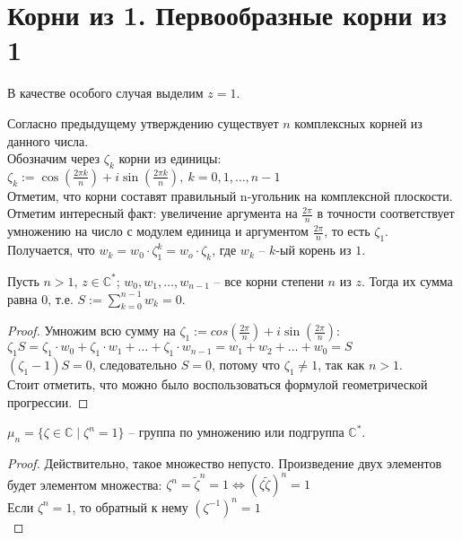 
\section{Корни из 1. Первообразные корни из 1}
\begin{normalsize}
  \begin{theorem-non}
    В качестве особого случая выделим $z=1$.
  \end{theorem-non}
  Согласно предыдущему утверждению существует $n$ комплексных корней из данного числа. \\

  Обозначим через $\zeta_k$ корни из единицы: \\ 

  $\zeta_k := \cos(\frac{2\pi k}{n}) + i\sin(\frac{2\pi k}{n}),\ k=0, 1, \dots, n-1$ \\

  Отметим, что корни составят правильный n-угольник на комплексной плоскости. \\

  Отметим интересный факт: увеличение аргумента на $\frac{2\pi}{n}$ в точности соответствует умножению на число с модулем единица и аргументом $\frac{2\pi}{n}$, то есть $\zeta_1$. \\

  Получается, что $w_k = w_0\cdot\zeta_1^k = w_o\cdot\zeta_k$, где $w_k$ – $k$-ый корень из $1$.

  \begin{theorem-non}
    Пусть $n>1$, $z\in\mathbb{C}^*$; $w_0, w_1, \dots, w_{n-1}$ -- все корни степени $n$ из $z$. Тогда их сумма равна 0, т.е. $S:= \sum_{k=0}^{n-1}w_k = 0$. 
  \end{theorem-non}

  \begin{proof}
    Умножим всю сумму на $\zeta_1:=cos(\frac{2\pi}{n}) + i\sin(\frac{2\pi}{n})$: \\ 
    $\zeta_1S=\zeta_1 \cdot w_0 + \zeta_1 \cdot w_1 + \dots + \zeta_1 \cdot w_{n-1} = w_1 + w_2 + \dots + w_0=S$ \\
    $(\zeta_1-1)S = 0$, следовательно $S=0$, потому что $\zeta_1 \neq 1$, так как $n > 1$. \\
    Стоит отметить, что можно было воспользоваться формулой геометрической прогрессии.
  \end{proof} 

  \begin{theorem-non}
    $\mu_n = \{ \zeta\in\mathbb{C} \mid \zeta^n = 1 \}$ – группа по умножению или подгруппа $\mathbb{C}^*$.
  \end{theorem-non}
  \begin{proof}
    Действительно, такое множество непусто. Произведение двух элементов будет элементом множества: 
    $\zeta^n = \tilde{\zeta}^n = 1 \Leftrightarrow (\zeta\tilde{\zeta})^n = 1$ \\
    Если $\zeta^n=1$, то обратный к нему $(\zeta^{-1})^n=1$ \\


\end{proof}
\end{normalsize}
